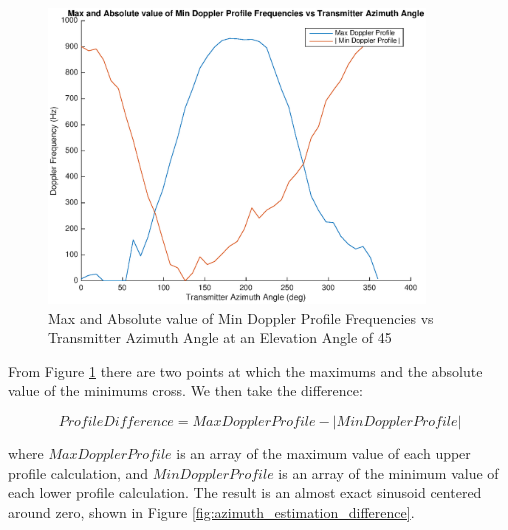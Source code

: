 \begin{figure}
	\begin{center}
		\includegraphics[width=10cm]{images/results/Azimuth_angle_estimation_max_vs_absMin.eps}
		\caption{Max and Absolute value of Min Doppler Profile Frequencies vs Transmitter Azimuth Angle at an Elevation Angle of 45\textdegree}
		\label{fig:azimuth_estimation_max_vs_absMin}
	\end{center}
\end{figure}

From Figure \ref{fig:azimuth_estimation_max_vs_absMin} there are two points at which the maximums and the absolute value of the minimums cross. We then take the difference:

\begin{equation}
	 Profile Difference = Max Doppler Profile - | Min Doppler Profile |
	 \label{eqn:difference}
\end{equation}

where $Max Doppler Profile$ is an array of the maximum value of each upper profile calculation, and $Min Doppler Profile$ is an array of the minimum value of each lower profile calculation. The result is an almost exact sinusoid centered around zero, shown in Figure \ref{fig:azimuth_estimation_difference}.

